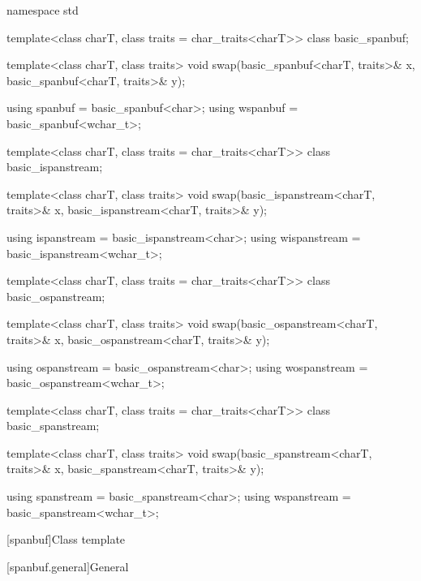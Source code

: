 %
%
%
%
%
%
%
%
\begin{codeblock}
namespace std {
  template<class charT, class traits = char_traits<charT>>
    class basic_spanbuf;

  template<class charT, class traits>
    void swap(basic_spanbuf<charT, traits>& x, basic_spanbuf<charT, traits>& y);

  using spanbuf = basic_spanbuf<char>;
  using wspanbuf = basic_spanbuf<wchar_t>;

  template<class charT, class traits = char_traits<charT>>
    class basic_ispanstream;

  template<class charT, class traits>
    void swap(basic_ispanstream<charT, traits>& x, basic_ispanstream<charT, traits>& y);

  using ispanstream = basic_ispanstream<char>;
  using wispanstream = basic_ispanstream<wchar_t>;

  template<class charT, class traits = char_traits<charT>>
    class basic_ospanstream;

  template<class charT, class traits>
    void swap(basic_ospanstream<charT, traits>& x, basic_ospanstream<charT, traits>& y);

  using ospanstream = basic_ospanstream<char>;
  using wospanstream = basic_ospanstream<wchar_t>;

  template<class charT, class traits = char_traits<charT>>
    class basic_spanstream;

  template<class charT, class traits>
    void swap(basic_spanstream<charT, traits>& x, basic_spanstream<charT, traits>& y);

  using spanstream = basic_spanstream<char>;
  using wspanstream = basic_spanstream<wchar_t>;
}
\end{codeblock}

[spanbuf]{Class template }

[spanbuf.general]{General}

